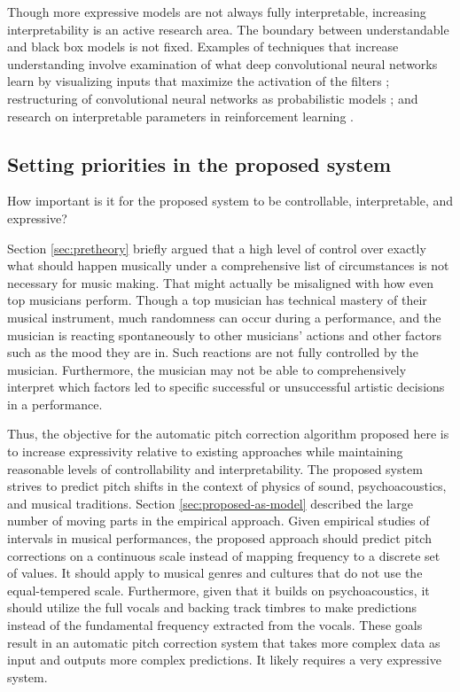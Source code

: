 Though more expressive models are not always fully interpretable, increasing interpretability is an active research area. The boundary between understandable and black box models is not fixed. Examples of techniques that increase understanding involve examination of what deep convolutional neural networks learn by visualizing inputs that maximize the activation of the filters \cite{qin2018convolutional}; restructuring of convolutional neural networks as probabilistic models \cite{patel2016probabilistic}; and research on interpretable parameters in reinforcement learning \cite{verma2018programmatically}. 

\subsection{Setting priorities in the proposed system}
How important is it for the proposed system to be controllable, interpretable, and expressive?

Section \ref{sec:pretheory} briefly argued that a high level of control over exactly what should happen musically under a comprehensive list of circumstances is not necessary for music making. That might actually be misaligned with how even top musicians perform. Though a top musician has technical mastery of their musical instrument, much randomness can occur during a performance, and the musician is reacting spontaneously to other musicians' actions and other factors such as the mood they are in. Such reactions are not fully controlled by the musician. Furthermore, the musician may not be able to comprehensively interpret which factors led to specific successful or unsuccessful artistic decisions in a performance. 

Thus, the objective for the automatic pitch correction algorithm proposed here is to increase expressivity relative to existing approaches while maintaining reasonable levels of controllability and interpretability. The proposed system strives to predict pitch shifts in the context of physics of sound, psychoacoustics, and musical traditions. Section \ref{sec:proposed-as-model} described the large number of moving parts in the empirical approach. Given empirical studies of intervals in musical performances, the proposed approach should predict pitch corrections on a continuous scale instead of mapping frequency to a discrete set of values. It should apply to musical genres and cultures that do not use the equal-tempered scale. Furthermore, given that it builds on psychoacoustics, it should utilize the full vocals and backing track timbres to make predictions instead of the fundamental frequency extracted from the vocals. These goals result in an automatic pitch correction system that takes more complex data as input and outputs more complex predictions. It likely requires a very expressive system.

